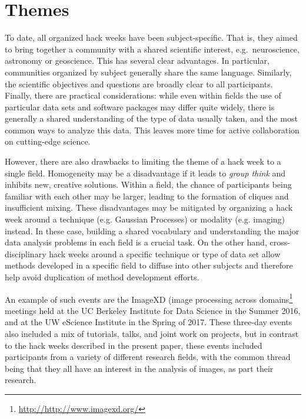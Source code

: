 \section*{Themes}

To date, all organized hack weeks have been subject-specific.
That is, they aimed to bring together a community with a shared scientific interest, e.g.\ neuroscience, astronomy or geoscience.
This has several clear advantages.
In particular, communities organized by subject generally share the same language.%
Similarly, the scientific objectives and questions are broadly clear to all participants.%
Finally, there are practical considerations: while even within fields the use of particular data sets and software packages may differ quite widely, there is generally a shared understanding of the type of data usually taken, and the most common ways to analyze this data.
This leaves more time for active collaboration on cutting-edge science.

However, there are also drawbacks to limiting the theme of a hack week to a single field.
Homogeneity may be a disadvantage if it leads to \textit{group think} and inhibits new, creative solutions.
Within a field, the chance of participants being familiar with each other may be larger, leading to the formation of cliques and insufficient mixing.
These disadvantages may be mitigated by organizing a hack week around a technique (e.g. Gaussian Processes) or modality (e.g. imaging) instead.
In these case, building a shared vocabulary and understanding the major data analysis problems in each field is a crucial task.%
On the other hand, cross-disciplinary hack weeks around a specific technique or type of data set allow methods developed in a specific field to diffuse into other subjects and therefore help avoid duplication of method development efforts.

An example of such events are the ImageXD (image processing across domains\footnote{\url{http://http://www.imagexd.org/}} meetings held at the UC Berkeley Institute for Data Science in the Summer 2016, and at the UW eScience Institute in the Spring of 2017.
These three-day events also included a mix of tutorials, talks, and joint work on projects, but in contrast to the hack weeks described in the present paper, these events included participants from a variety of different research fields, with the common thread being that they all have an interest in the analysis of images, as part their research.
